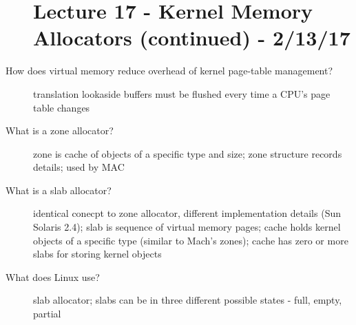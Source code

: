 \documentclass[10pt]{article}
\begin{document}
\begin{description}
\section{Lecture 17 - Kernel Memory Allocators (continued) - 2/13/17}
\item[How does virtual memory reduce overhead of kernel page-table management?]
  translation lookaside buffers must be flushed every time a CPU's page table changes
\item[What is a zone allocator?]
  zone is cache of objects of a specific type and size;
  zone structure records details;
  used by MAC
\item[What is a slab allocator?]
  identical conecpt to zone allocator, different implementation details (Sun Solaris 2.4);
  slab is sequence of virtual memory pages;
  cache holds kernel objects of a specific type (similar to Mach's zones);
  cache has zero or more slabs for storing kernel objects
\item[What does Linux use?]
  slab allocator;
  slabs can be in three different possible states - full, empty, partial
\end{description}
\end{document}
